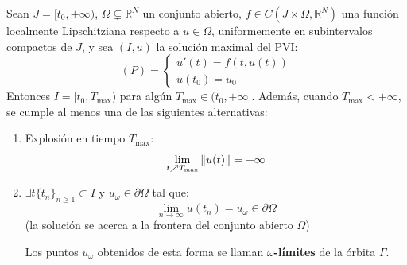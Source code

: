 \begin{teorema} 
    Sean $J = [t_0, +\infty)$, $\Omega \subsetneq \mathbb{R}^N$ un conjunto abierto, $f \in C(J \times \Omega, \mathbb{R}^N)$ una función localmente Lipschitziana respecto a $u \in \Omega$, uniformemente en subintervalos compactos de $J$, y sea $(I, u)$ la solución maximal del PVI:
    \[
        (P) =
        \begin{cases}
            u'(t) = f(t, u(t)) \\
            u(t_0) = u_0
        \end{cases}
    \]
    Entonces $I = [t_0, T_{\text{max}})$ para algún $T_{\text{max}} \in (t_0, +\infty]$. Además, cuando $T_{\text{max}} < +\infty$, se cumple al menos una de las siguientes alternativas:
    \begin{enumerate}
        \item Explosión en tiempo $T_{\text{max}}$:
        \[
            \varlimsup_{t \nearrow T_{\text{max}}} \| u(t) \| = +\infty
        \]
        \item $\exists t\{t_n\}_{n \geq 1} \subset I$ y $u_\omega \in \partial \Omega$ tal que:
        \[
            \lim_{n \to \infty} u(t_n) = u_\omega \in \partial \Omega
        \]
        (la solución se acerca a la frontera del conjunto abierto $\Omega$)

        Los puntos $u_\omega$ obtenidos de esta forma se llaman \textbf{$\omega$-límites} de la órbita $\Gamma$.
    \end{enumerate}
\end{teorema}

